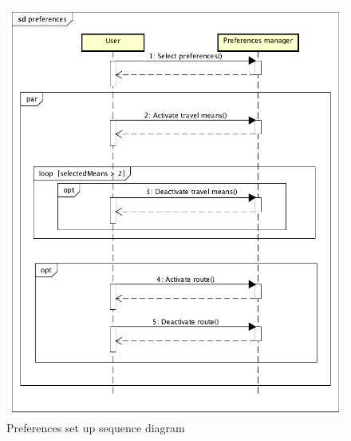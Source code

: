 \begin{figure}
	\centering
	\includegraphics[width=1.3\textwidth]{images/preferences}
	\caption{Preferences set up sequence diagram}

	\label{fig:preferences}
\end{figure}
